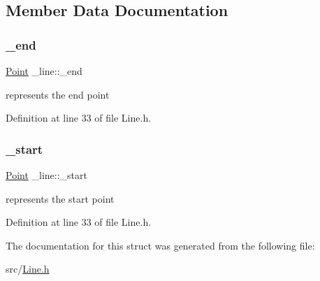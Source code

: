 \subsection{Member Data Documentation}
\mbox{\label{struct__line_a081e0006fa57d07bfb8ef30b5056a58a}} 
\subsubsection{\texorpdfstring{\_end}{\_end}}
{\footnotesize\ttfamily \mbox{\hyperlink{struct_point}{Point}} \+\_\+line\+::\+\_\+end}

represents the end point 

Definition at line 33 of file Line.\+h.

\mbox{\label{struct__line_a21249c64d9d4f9818059a9c99943df4b}} 
\subsubsection{\texorpdfstring{\_start}{\_start}}
{\footnotesize\ttfamily \mbox{\hyperlink{struct_point}{Point}} \+\_\+line\+::\+\_\+start}

represents the start point 

Definition at line 33 of file Line.\+h.



The documentation for this struct was generated from the following file\+:\begin{DoxyCompactItemize}
\item 
src/\mbox{\hyperlink{_line_8h}{Line.\+h}}\end{DoxyCompactItemize}
